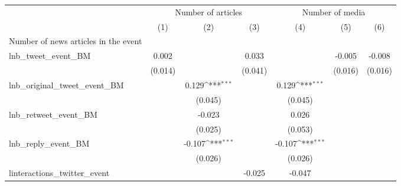 {
\def\sym#1{\ifmmode^{#1}\else\(^{#1}\)\fi}
\begin{tabular}{l*{6}{c}}
\hline\hline
                    &\multicolumn{3}{c}{Number of articles}                           &\multicolumn{3}{c}{Number of media}                              \\\cmidrule(lr){2-4}\cmidrule(lr){5-7}
                    &\multicolumn{1}{c}{(1)}         &\multicolumn{1}{c}{(2)}         &\multicolumn{1}{c}{(3)}         &\multicolumn{1}{c}{(4)}         &\multicolumn{1}{c}{(5)}         &\multicolumn{1}{c}{(6)}         \\
\hline
Number of news articles in the event&                     &                     &                     &                     &                     &                     \\
lnb\_tweet\_event\_BM  &       0.002         &                     &       0.033         &                     &      -0.005         &      -0.008         \\
                    &     (0.014)         &                     &     (0.041)         &                     &     (0.016)         &     (0.016)         \\
lnb\_original\_tweet\_event\_BM&                     &       0.129\sym{***}&                     &       0.129\sym{***}&                     &                     \\
                    &                     &     (0.045)         &                     &     (0.045)         &                     &                     \\
lnb\_retweet\_event\_BM&                     &      -0.023         &                     &       0.026         &                     &                     \\
                    &                     &     (0.025)         &                     &     (0.053)         &                     &                     \\
lnb\_reply\_event\_BM  &                     &      -0.107\sym{***}&                     &      -0.107\sym{***}&                     &                     \\
                    &                     &     (0.026)         &                     &     (0.026)         &                     &                     \\
linteractions\_twitter\_event&                     &                     &      -0.025         &      -0.047         &                     &                     \\

\end{tabular}}
